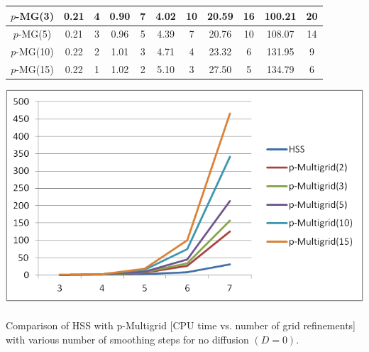 \documentclass[mathserif]{beamer}
\begin{document}
\begin{frame}
\begin{minipage}{.45\textwidth}
\begin{table}[h!]
\begin{tabular}{|c|c|c|c|c|c|c|c|c|c|c|}
$p$-MG(3)  & 0.21 &  4 & 0.90 &  7 & 4.02 & 10 &  20.59 & 16 & 100.21 & 20 \\ \hline
$p$-MG(5)  & 0.21 &  3 & 0.96 &  5 & 4.39 &  7 &  20.76 & 10 & 108.07 & 14 \\ \hline
$p$-MG(10) & 0.22 &  2 & 1.01 &  3 & 4.71 &  4 &  23.32 &  6 & 131.95 &  9 \\ \hline
$p$-MG(15) & 0.22 &  1 & 1.02 &  2 & 5.10 &  3 &  27.50 &  5 & 134.79 &  6 \\ \hline
\end{tabular}
\label{CC-comp-D=0}
\end{table}
\normalsize
\end{minipage}
\begin{minipage}{.4\textwidth}
\hspace{15mm}
\begin{minipage}{.95\textwidth}
\includegraphics[width=\textwidth]{resultGraphs/circularConvection/comparison1e-1.png}\ \\
{\small {Comparison of HSS with p-Multigrid [CPU time vs. number of grid refinements] with various number of smoothing steps for no diffusion $(D = 0)$.}}
\end{minipage}
\end{minipage}
\end{frame}
\end{document}
